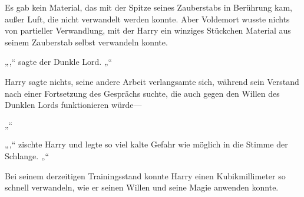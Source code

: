 Es gab kein Material, das mit der Spitze seines Zauberstabs in Berührung kam, außer Luft, die nicht verwandelt werden konnte. Aber Voldemort wusste nichts von partieller Verwandlung, mit der Harry ein winziges Stückchen Material aus seinem Zauberstab selbst verwandeln konnte.

„,“ sagte der Dunkle Lord. „“

Harry sagte nichts, seine andere Arbeit verlangsamte sich, während sein Verstand nach einer Fortsetzung des Gesprächs suchte, die auch gegen den Willen des Dunklen Lords funktionieren würde—

„“

„,“ zischte Harry und legte so viel kalte Gefahr wie möglich in die Stimme der Schlange. „“

Bei seinem derzeitigen Trainingsstand konnte Harry einen Kubikmillimeter so schnell verwandeln, wie er seinen Willen und seine Magie anwenden konnte.

